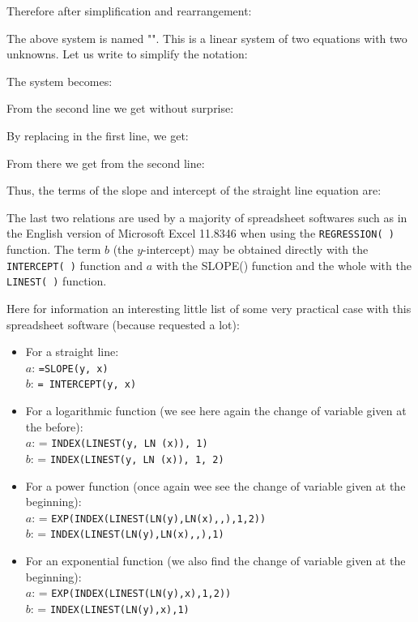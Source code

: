 	Therefore after simplification and rearrangement:
	
	The above system is named "". This is a linear system of two equations with two unknowns. Let us write to simplify the notation:
	
	The system becomes:
	
	From the second line we get without surprise:
	
	By replacing in the first line, we get:
	
	From there we get from the second line:
	
	Thus, the terms of the slope and intercept of the straight line equation are:
	
	The last two relations are used by a majority of spreadsheet softwares such as in the English version of Microsoft Excel 11.8346 when using the \texttt{REGRESSION( )} function. The term $b$ (the $y$-intercept) may be obtained directly with the \texttt{INTERCEPT( )} function and $a$ with the SLOPE() function and the whole with the \texttt{LINEST( )} function.
	
	Here for information an interesting little list of some very practical case with this spreadsheet software (because requested a lot):
	\begin{itemize}
		\item For a straight line:\\
		
		$a$: \texttt{=SLOPE(y, x)}\\
		$b$: \texttt{= INTERCEPT(y, x)}
		
		\item For a logarithmic function (we see here again the change of variable given at the before):\\
		
		$a$: = \texttt{INDEX(LINEST(y, LN (x)), 1)}\\
		$b$: = \texttt{INDEX(LINEST(y, LN (x)), 1, 2)}
		
		\item For a power function (once again wee see the change of variable given at the beginning):\\
		
		$a$: = \texttt{EXP(INDEX(LINEST(LN(y),LN(x),,),1,2))}\\
		$b$: = \texttt{INDEX(LINEST(LN(y),LN(x),,),1)}
		
		\item For an exponential function (we also find the change of variable given at the beginning):\\
		
		$a$: = \texttt{EXP(INDEX(LINEST(LN(y),x),1,2))}\\
		$b$: = \texttt{INDEX(LINEST(LN(y),x),1)}\\
	\end{itemize}
	
